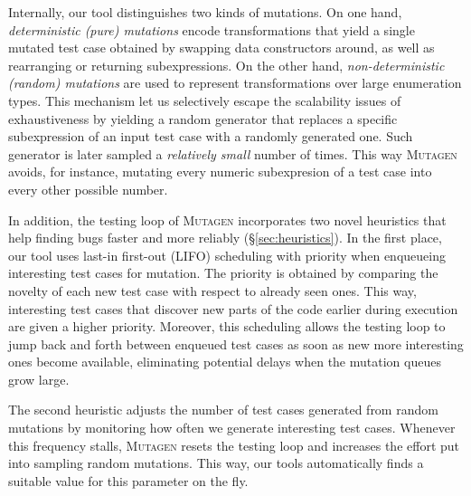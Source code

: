 \documentclass[sigconf,review,anonymous]{acmart}
\newcommand{\mutagen}{\textsc{Mutagen}\xspace}
\begin{document}
%
Internally, our tool distinguishes two kinds of mutations.
%
On one hand, \emph{deterministic (pure) mutations} encode transformations that
yield a single mutated test case obtained by swapping data constructors around,
as well as rearranging or returning subexpressions.
%
On the other hand, \emph{non-deterministic (random) mutations} are used to
represent transformations over large enumeration types.
%
%
This mechanism let us selectively escape the scalability issues of
exhaustiveness by yielding a random generator that replaces a specific
subexpression of an input test case with a randomly generated one.
%
Such generator is later sampled a \emph{relatively small} number of times. 
%
This way \mutagen avoids, for instance, mutating every numeric subexpresion of a
test case into every other possible number.


In addition, the testing loop of \mutagen incorporates two novel heuristics that
help finding bugs faster and more reliably (\S \ref{sec:heuristics}).
%
In the first place, our tool uses last-in first-out (LIFO) scheduling with
priority when enqueueing interesting test cases for mutation.
%
The priority is obtained by comparing the novelty of each new test case with
respect to already seen ones.
%
This way, interesting test cases that discover new parts of the code earlier
during execution are given a higher priority.
%
Moreover, this scheduling allows the testing loop to jump back and forth between
enqueued test cases as soon as new more interesting ones become available,
eliminating potential delays when the mutation queues grow large.


The second heuristic adjusts the number of test cases generated from random
mutations  
%
%
by monitoring how often we generate interesting test cases.
%
Whenever this frequency stalls, \mutagen resets the testing loop and increases the
effort put into sampling random mutations.
%
This way, our tools automatically finds a suitable value for this parameter on
the fly.
\end{document}
